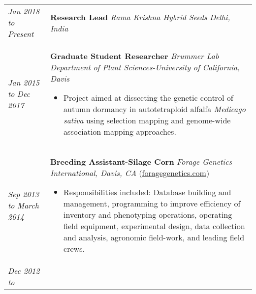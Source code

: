 ﻿\documentclass[a4paper]{article}
\begin{document}
\begin{tabular}{p{3cm} p{14cm}}
\textit{Jan 2018}\newline
\textit{to}\newline
\textit{Present}\newline
& 
\vspace{0pt}
\textbf{Research Lead}\newline
\textit{Rama Krishna Hybrid Seeds}\newline
\textit{Delhi, India}
%
\\
%
\vspace{0pt} 
\textit{Jan 2015}\newline
\textit{to}\newline
\textit{Dec 2017}\newline
& 
\vspace{0pt}
\textbf{Graduate Student Researcher}\newline
\textit{Brummer Lab}\newline
\textit{Department of Plant Sciences-University of California, Davis}
\begin{itemize}[noitemsep,topsep=0pt]
  \item Project aimed at dissecting the genetic control of autumn dormancy in autotetraploid alfalfa \textit{Medicago sativa} using selection mapping and genome-wide association mapping approaches.
\end{itemize}
%
\\
%
\vspace{0pt} 
\textit{Sep 2013}\newline
\textit{to}\newline
\textit{March 2014}\newline
& 
\vspace{0pt}
\textbf{Breeding Assistant-Silage Corn}\newline
\textit{Forage Genetics International, Davis, CA} (\href{http://www.foragegenetics.com/}{foragegenetics.com})
\begin{itemize}[noitemsep,topsep=0pt]
  \item Responsibilities included: Database building and management, programming to improve efficiency of inventory and phenotyping operations, operating field equipment, experimental design, data collection and analysis, agronomic field-work, and leading field crews.
\end{itemize}
%
\\
%
\vspace{0pt} 
\textit{Dec 2012}\newline
\textit{to}\newline

\end{tabular}
\end{document}

